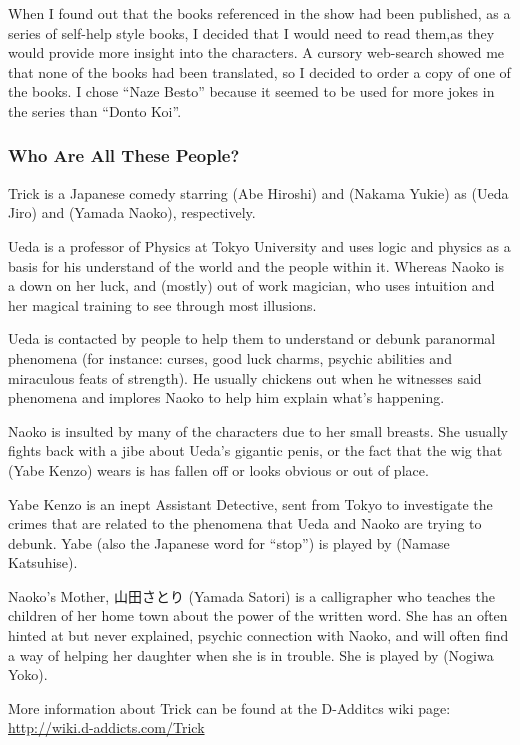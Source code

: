 \par When I found out that the books referenced in the show had been published, as a series of self-help style books, I decided that I would need to read them,as they would provide more insight into the characters. A cursory web-search showed me that none of the books had been translated, so I decided to order a copy of one of the books. I chose ``Naze Besto'' because it seemed to be used for more jokes in the series than ``Donto Koi''.


\subsubsection{Who Are All These People?}

Trick is a Japanese comedy starring  (Abe Hiroshi) and  (Nakama Yukie) as  (Ueda Jiro) and  (Yamada Naoko), respectively.

\par Ueda is a professor of Physics at Tokyo University and uses logic and physics as a basis for his understand of the world and the people within it. Whereas Naoko is a down on her luck, and (mostly) out of work magician, who uses intuition and her magical training to see through most illusions.

\par Ueda is contacted by people to help them to understand or debunk paranormal phenomena (for instance: curses, good luck charms, psychic abilities and miraculous feats of strength). He usually chickens out when he witnesses said phenomena and implores Naoko to help him explain what's happening.

\par Naoko is insulted by many of the characters due to her small breasts. She usually fights back with a jibe about Ueda's gigantic penis, or the fact that the wig that  (Yabe Kenzo) wears is has fallen off or looks obvious or out of place.

\par Yabe Kenzo is an inept Assistant Detective, sent from Tokyo to investigate the crimes that are related to the phenomena that Ueda and Naoko are trying to debunk. Yabe (also the Japanese word for ``stop'') is played by  (Namase Katsuhise).

\par Naoko's Mother, 山田さとり (Yamada Satori) is a calligrapher who teaches the children of her home town about the power of the written word. She has an often hinted at but never explained, psychic connection with Naoko, and will often find a way of helping her daughter when she is in trouble. She is played by  (Nogiwa Yoko).

\par More information about Trick can be found at the D-Additcs wiki page: \url{http://wiki.d-addicts.com/Trick}